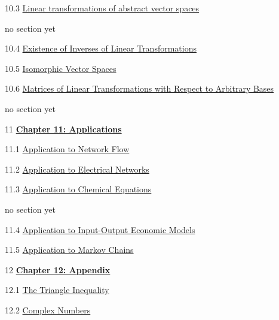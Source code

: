 \documentclass{ximera}
\begin{document}
10.3	\href{https://ximera.osu.edu/oerlinalg/LinearAlgebra/LTR-0022/main}{Linear transformations of abstract vector spaces}
	
	no section yet
	
10.4	\href{https://ximera.osu.edu/oerlinalg/LinearAlgebra/LTR-0035/main}{Existence of Inverses of Linear Transformations}
	
10.5	\href{https://ximera.osu.edu/oerlinalg/LinearAlgebra/LTR-0060/main}{Isomorphic Vector Spaces}
	
10.6	\href{https://ximera.osu.edu/oerlinalg/LinearAlgebra/LTR-0080/main}{Matrices of Linear Transformations with Respect to Arbitrary Bases}
	
	no section yet
	
11	\href{https://ximera.osu.edu/oerlinalg/LinearAlgebra/XLAChapter_applications/main}{\textbf{Chapter 11: Applications}}
	
11.1	\href{https://ximera.osu.edu/oerlinalg/LinearAlgebra/APP-0010/main}{Application to Network Flow}
	
11.2	\href{https://ximera.osu.edu/oerlinalg/LinearAlgebra/APP-0020/main}{Application to Electrical Networks}
	
11.3	\href{https://ximera.osu.edu/oerlinalg/LinearAlgebra/APP-0030/main}{Application to Chemical Equations}
	
	no section yet
	
11.4	\href{https://ximera.osu.edu/oerlinalg/LinearAlgebra/APP-0050/main}{Application to Input-Output Economic Models}
	
11.5	\href{https://ximera.osu.edu/oerlinalg/LinearAlgebra/APP-0060/main}{Application to Markov Chains}
	
	
	
	
	
	
	
12	\href{https://ximera.osu.edu/oerlinalg/LinearAlgebra/XLAChapter_appendix/main}{\textbf{Chapter 12: Appendix}}
	
12.1	\href{https://ximera.osu.edu/oerlinalg/LinearAlgebra/APX-0010/main}{The Triangle Inequality}
	
12.2	\href{https://ximera.osu.edu/oerlinalg/LinearAlgebra/APX-0020/main}{Complex Numbers}
	
\end{document}
